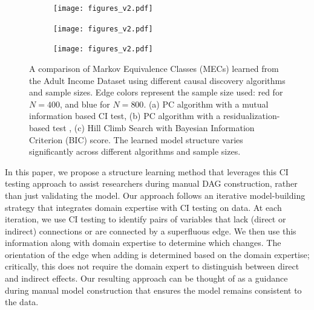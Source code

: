 \documentclass{uai2025} %
\begin{document}

\begin{figure}[t!]
    \begin{subfigure}{0.5 \textwidth}
	\centering
    	\texttt{[image: figures\_v2.pdf]}
    	\caption{}
    \end{subfigure}
    \begin{subfigure}{0.5\textwidth}
	\centering
    	\texttt{[image: figures\_v2.pdf]}
    	\caption{}
    \end{subfigure}
    \begin{subfigure}{0.5\textwidth}
	\centering
    	\texttt{[image: figures\_v2.pdf]}
    	\caption{}
    \end{subfigure}

    \caption{A comparison of Markov Equivalence Classes (MECs) learned from the Adult
	     Income Dataset \citep{Becker1996} using different causal discovery
	     algorithms and sample sizes. Edge colors represent the sample size
	     used: red for $N=400$, and blue for $N=800$. (a) PC algorithm with a
	     mutual information based CI test, (b) PC algorithm with a
    	     residualization-based test \citep{Ankan2023}, (c) Hill Climb Search with
	     Bayesian Information Criterion (BIC) score. The learned model structure varies
             significantly across different algorithms and sample sizes.}
    \label{fig:intro}
\end{figure}

In this paper, we propose a structure learning method that leverages this CI
testing approach to assist researchers during manual DAG construction, rather
than just validating the model. Our approach follows an iterative
model-building strategy that integrates domain expertise with CI testing on
data. At each iteration, we use CI testing to identify pairs of variables that
lack (direct or indirect) connections or are connected by a superfluous edge.
 We then use this information
along with domain expertise to determine which changes.
The orientation of the edge when adding is determined based on the domain
expertise; critically, this does not require the domain expert to distinguish 
between direct and indirect effects. Our resulting approach can be 
thought of as a guidance during manual model construction that ensures the 
model remains consistent to the data.
\end{document}
